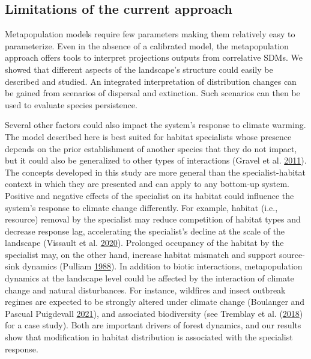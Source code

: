 \documentclass[12pt]{article}
\begin{document}
\hypertarget{limitations-of-the-current-approach}{%
\subsection{Limitations of the current
approach}\label{limitations-of-the-current-approach}}

Metapopulation models require few parameters making them relatively easy
to parameterize. Even in the absence of a calibrated model, the
metapopulation approach offers tools to interpret projections outputs
from correlative SDMs. We showed that different aspects of the
landscape's structure could easily be described and studied. An
integrated interpretation of distribution changes can be gained from
scenarios of dispersal and extinction. Such scenarios can then be used
to evaluate species persistence.

Several other factors could also impact the system's response to climate
warming. The model described here is best suited for habitat specialists
whose presence depends on the prior establishment of another species
that they do not impact, but it could also be generalized to other types
of interactions (Gravel et al.
\protect\hyperlink{ref-gravel_trophic_2011}{2011}). The concepts
developed in this study are more general than the specialist-habitat
context in which they are presented and can apply to any bottom-up
system. Positive and negative effects of the specialist on its habitat
could influence the system's response to climate change differently. For
example, habitat (i.e., resource) removal by the specialist may reduce
competition of habitat types and decrease response lag, accelerating the
specialist's decline at the scale of the landscape (Vissault et al.
\protect\hyperlink{ref-vissault_slow_2020}{2020}). Prolonged occupancy
of the habitat by the specialist may, on the other hand, increase
habitat mismatch and support source-sink dynamics (Pulliam
\protect\hyperlink{ref-pulliam_sources_1988}{1988}). In addition to
biotic interactions, metapopulation dynamics at the landscape level
could be affected by the interaction of climate change and natural
disturbances. For instance, wildfires and insect outbreak regimes are
expected to be strongly altered under climate change (Boulanger and
Pascual Puigdevall \protect\hyperlink{ref-boulanger_boreal_2021}{2021}),
and associated biodiversity (see Tremblay et al.
(\protect\hyperlink{ref-tremblay_harvesting_2018}{2018}) for a case
study). Both are important drivers of forest dynamics, and our results
show that modification in habitat distribution is associated with the
specialist response.
\end{document}
